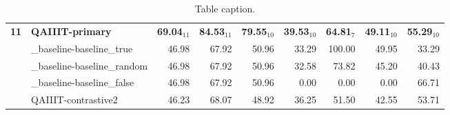 \begin{table*}[tbh]
\begin{center}
\begin{tabular}{clrrrrrrr}
\bf 11 & \bf QAIIIT-primary & \bf 69.04$_{11}$ & \bf \scriptsize 84.53$_{11}$ & \bf \scriptsize 79.55$_{10}$ & \bf \scriptsize 39.53$_{10}$ & \bf \scriptsize 64.81$_{7}$ & \bf \scriptsize 49.11$_{10}$ & \bf \scriptsize 55.29$_{10}$ \\
& \_baseline-baseline\_true & 46.98 & \scriptsize 67.92 & \scriptsize 50.96 & \scriptsize 33.29 & \scriptsize 100.00 & \scriptsize 49.95 & \scriptsize 33.29 \\
& \_baseline-baseline\_random & 46.98 & \scriptsize 67.92 & \scriptsize 50.96 & \scriptsize 32.58 & \scriptsize 73.82 & \scriptsize 45.20 & \scriptsize 40.43 \\
& \_baseline-baseline\_false & 46.98 & \scriptsize 67.92 & \scriptsize 50.96 & \scriptsize  0.00 & \scriptsize  0.00 & \scriptsize  0.00 & \scriptsize 66.71 \\
& QAIIIT-contrastive2 & 46.23 & \scriptsize 68.07 & \scriptsize 48.92 & \scriptsize 36.25 & \scriptsize 51.50 & \scriptsize 42.55 & \scriptsize 53.71 \\
\end{tabular}
\caption{Table caption.}
\label{table:results}
\end{center}
\end{table*}
